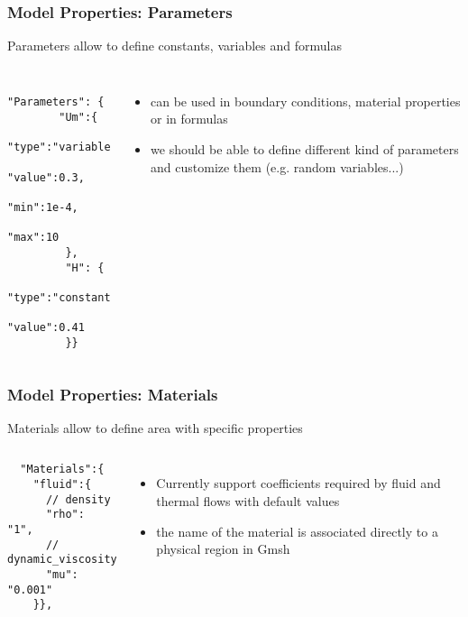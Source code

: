 \begin{frame}[fragile]
  \frametitle{Model Properties: Parameters}
  Parameters allow to define constants, variables and formulas
  \begin{columns}[c]
    \begin{verbatim}
      "Parameters": {
        "Um":{
           "type":"variable",
           "value":0.3,
           "min":1e-4,
           "max":10
         },
         "H": {
           "type":"constant",
           "value":0.41
         }}
    \end{verbatim}
    \begin{itemize}
    \item can be used in boundary conditions, material properties or
      in formulas
    \item we should be able to define different kind of parameters and
      customize them (e.g. random variables...)
    \end{itemize}
  \end{columns}
\end{frame}

\begin{frame}[fragile]
  \frametitle{Model Properties: Materials}
  Materials allow to define area with specific properties
  \begin{columns}[c]
    \begin{verbatim}
  "Materials":{
    "fluid":{
      // density
      "rho": "1",
      // dynamic_viscosity
      "mu": "0.001"
    }},
\end{verbatim}
    \begin{itemize}
    \item Currently support coefficients required by fluid and thermal
      flows with default values
    \item the name of the material is associated directly to a
      physical region in Gmsh
    \end{itemize}
  \end{columns}
\end{frame}

